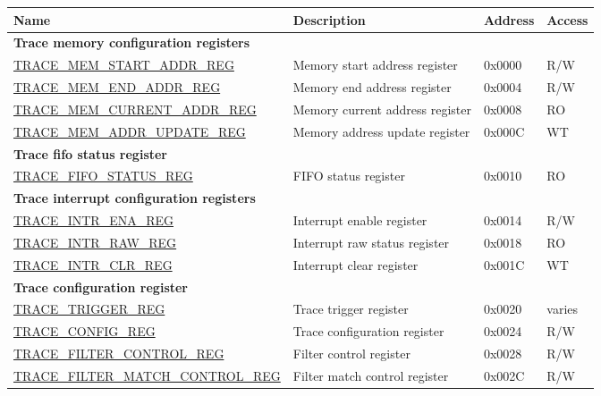 \begin{longtable}{ | p{8cm} | p{6.2cm} | p{1.3cm} | p{1cm} | }
\hline\rowcolor{lightgray}
\textbf{Name} & \textbf{Description} &  \textbf{Address} & \textbf{Access} \\ \hline
\endhead
\multicolumn{4}{|l|}{\textbf{Trace memory configuration registers}} \\ \hline
\hyperref[regdesc:TRACEMEMSTARTADDRREG]{TRACE\_MEM\_START\_ADDR\_REG} & Memory start address register & 0x0000 & R/W \\ \hline
\hyperref[regdesc:TRACEMEMENDADDRREG]{TRACE\_MEM\_END\_ADDR\_REG} & Memory end address register & 0x0004 & R/W \\ \hline
\hyperref[regdesc:TRACEMEMCURRENTADDRREG]{TRACE\_MEM\_CURRENT\_ADDR\_REG} & Memory current address register & 0x0008 & RO \\ \hline
\hyperref[regdesc:TRACEMEMADDRUPDATEREG]{TRACE\_MEM\_ADDR\_UPDATE\_REG} & Memory address update register & 0x000C & WT \\ \hline
\multicolumn{4}{|l|}{\textbf{Trace fifo status register}} \\ \hline
\hyperref[regdesc:TRACEFIFOSTATUSREG]{TRACE\_FIFO\_STATUS\_REG} & FIFO status register & 0x0010 & RO \\ \hline
\multicolumn{4}{|l|}{\textbf{Trace interrupt configuration registers}} \\ \hline
\hyperref[regdesc:TRACEINTRENAREG]{TRACE\_INTR\_ENA\_REG} & Interrupt enable register & 0x0014 & R/W \\ \hline
\hyperref[regdesc:TRACEINTRRAWREG]{TRACE\_INTR\_RAW\_REG} & Interrupt raw status register & 0x0018 & RO \\ \hline
\hyperref[regdesc:TRACEINTRCLRREG]{TRACE\_INTR\_CLR\_REG} & Interrupt clear register & 0x001C & WT \\ \hline
\multicolumn{4}{|l|}{\textbf{Trace configuration register}} \\ \hline
\hyperref[regdesc:TRACETRIGGERREG]{TRACE\_TRIGGER\_REG} & Trace trigger register & 0x0020 & varies \\ \hline
\hyperref[regdesc:TRACECONFIGREG]{TRACE\_CONFIG\_REG} & Trace configuration register & 0x0024 & R/W \\ \hline
\hyperref[regdesc:TRACEFILTERCONTROLREG]{TRACE\_FILTER\_CONTROL\_REG} & Filter control register & 0x0028 & R/W \\ \hline
\hyperref[regdesc:TRACEFILTERMATCHCONTROLREG]{TRACE\_FILTER\_MATCH\_CONTROL\_REG} & Filter match control register & 0x002C & R/W \\ \hline

\end{longtable}
